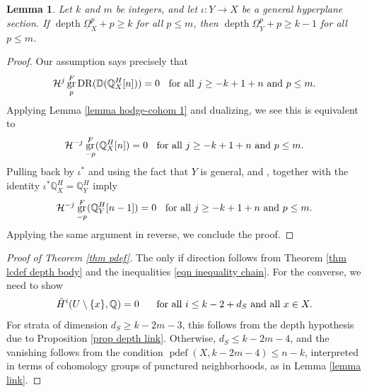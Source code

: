 \documentclass[11pt]{amsart}
\newtheorem{lemma}[equation]{Lemma}
\theoremstyle{definition}
\theoremstyle{plain}
\DeclareMathOperator{\gr}{gr}
\DeclareMathOperator{\dr}{DR}
\DeclareMathOperator{\pdef}{pdef}
\DeclareMathOperator{\depth}{depth}
\begin{document}
\begin{lemma}\label{lem depth hyperplane}
Let $k$ and $m$ be integers, and let $\iota: Y \rightarrow X$ be a general hyperplane section. If $\depth \underline{\Omega}_X^p + p \geq k$ for all $p \leq m$, then $\depth \underline{\Omega}_Y^p + p \geq k-1$ for all $p \leq m$.
\end{lemma}

\begin{proof}
Our assumption says precisely that 
\begin{align*}
     \mathcal{H}^j \gr_p^F \dr( \mathbb{D}(\mathbb{Q}_X^H[n])) = 0 \hspace{.2cm} \text{ for all } j \geq -k+1+n \text{ and } p \leq m.
\end{align*}
Applying Lemma \ref{lemma hodge-cohom 1} and dualizing, we see this is equivalent to
\begin{align*}
     \mathcal{H}^{-j} \gr_{-p}^F (\mathbb{Q}_X^H[n]) = 0 \hspace{.2cm} \text{ for all } j \geq -k+1+n \text{ and } p \leq m.
\end{align*}
Pulling back by $\iota^*$ and using the fact that $Y$ is general, \cite[Lemma $2.25$]{saito 90} and \cite[Theorem $9.3$]{schnell}, together with the identity $\iota^* \mathbb{Q}_X^H = \mathbb{Q}_Y^H$ imply
\begin{align*}
     \mathcal{H}^{-j} \gr_{-p}^F(\mathbb{Q}_Y^H[n-1]) = 0 \hspace{.2cm} \text{ for all } j \geq -k+1+n \text{ and } p \leq m.
\end{align*}
Applying the same argument in reverse, we conclude the proof.
\end{proof} 


\begin{proof}[Proof of Theorem \ref{thm pdef}]
The only if direction follows from Theorem \ref{thm lcdef depth body} and the inequalities \ref{eqn inequality chain}. For the converse, we need to show
\begin{align*}
    \Tilde{H}^i(U \setminus \{ x\}, \mathbb{Q}) = 0 \hspace{.5cm} \text{ for all } i \leq k-2+d_S \text{ and all } x \in X.
\end{align*}
For strata of dimension $d_S \geq k-2m-3$, this follows from the depth hypothesis due to Proposition \ref{prop depth link}. Otherwise, $d_S \leq k-2m-4$, and the vanishing follows from the condition $\pdef(X, k-2m-4) \leq n-k$, interpreted in terms of cohomology groups of punctured neighborhoods, as in Lemma \ref{lemma link}.
\end{proof}
\end{document}
